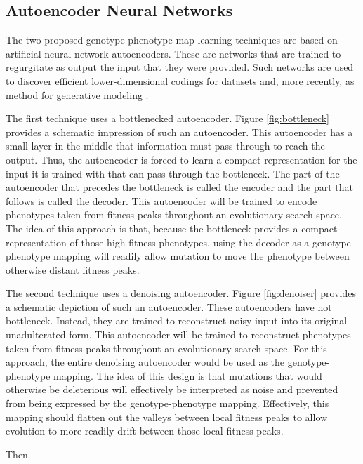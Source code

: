\subsection{Autoencoder Neural Networks}

The two proposed genotype-phenotype map learning techniques are based on artificial neural network autoencoders.
These are networks that are trained to regurgitate as output the input that they were provided.
Such networks are used to discover efficient lower-dimensional codings for datasets and, more recently, as method for generative modeling \cite{liou2014autoencoder, kingma2013auto}.




The first technique uses a bottlenecked autoencoder.
Figure \ref{fig:bottleneck} provides a schematic impression of such an autoencoder.
This autoencoder has a small layer in the middle that information must pass through to reach the output.
Thus, the autoencoder is forced to learn a compact representation for the input it is trained with that can pass through the bottleneck.
The part of the autoencoder that precedes the bottleneck is called the encoder and the part that follows is called the decoder.
This autoencoder will be trained to encode phenotypes taken from fitness peaks throughout an evolutionary search space.
The idea of this approach is that, because the bottleneck provides a compact representation of those high-fitness phenotypes, using the decoder as a genotype-phenotype mapping will readily allow mutation to move the phenotype between otherwise distant fitness peaks.



The second technique uses a denoising autoencoder.
Figure \ref{fig:denoiser} provides a schematic depiction of such an autoencoder.
These autoencoders have not bottleneck.
Instead, they are trained to reconstruct noisy input into its original unadulterated form.
This autoencoder will be trained to reconstruct phenotypes taken from fitness peaks throughout an evolutionary search space.
For this approach, the entire denoising autoencoder would be used as the genotype-phenotype mapping.
The idea of this design is that mutations that would otherwise be deleterious will effectively be interpreted as noise and prevented from being expressed by the genotype-phenotype mapping.
Effectively, this mapping should flatten out the valleys between local fitness peaks to allow evolution to more readily drift between those local fitness peaks.


Then
\cite{lecun2015deep}

